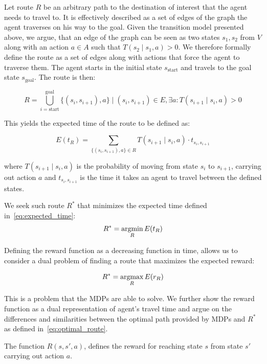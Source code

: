 Let route $R$ be an arbitrary path to the destination of interest that the
agent needs to travel to. It is effectively described as a set of edges of the
graph the agent traverses on his way to the goal. Given the transition model
presented above, we argue, that an edge of the graph can be seen as two states
$s_1, s_2$ from $V$ along with an action $a \in A$ such that $T(s_2 \mid s_1,
a) > 0$. We therefore formally define the route as a set of edges along with
actions that force the agent to traverse them. The agent starts in the initial
state $s_\mathrm{start}$ and travels to the goal state $s_\mathrm{goal}$. The
route is then:

\begin{equation}
R = \bigcup_{i=\mathrm{start}}^{\mathrm{goal}} \{(s_i, s_{i+1}), a \} \mid (s_i, s_{i+1}) \in E, \exists a: T(s_{i+1} \mid s_i, a) > 0
\end{equation}

This yields the expected time of the route to be defined as:

\begin{equation}
\label{eq:expected_time}
E(t_R) = \sum_{\{(s_i, s_{i+1}), a \} \in R} T(s_{i+1} \mid s_i, a) \cdot t_{s_i, s_{i+1}}
\end{equation}

where $T(s_{i+1} \mid s_i, a)$ is the probability of moving from state $s_i$
to $s_{i+1}$, carrying out action $a$ and $t_{s_i, s_{i+1}}$ is the time it
takes an agent to travel between the defined states.

We seek such route $R^*$ that minimizes the expected time defined in~\eqref{eq:expected_time}:
\begin{equation}
\label{eq:optimal_route}
    R^* = \mathop{\rm argmin}_R E(t_R)
\end{equation}

Defining the reward function as a decreasing function in time, allows us to
consider a dual problem of finding a route that maximizes the expected reward:

\begin{equation}
    R^* = \mathop{\rm argmax}_R E(r_R)
\end{equation}

This is a problem that the MDPs are able to solve. We further show the reward
function as a dual representation of agent's travel time and argue on the
differences and similarities between the optimal path provided by MDPs and
$R^*$ as defined in~\eqref{eq:optimal_route}.

The function $R(s, s', a)$, defines the reward for reaching state $s$ from
state $s'$ carrying out action $a$.

